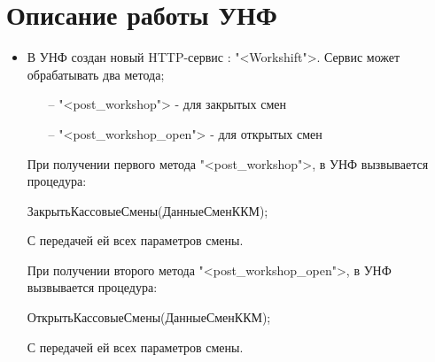 \section{Описание работы УНФ}

\begin{itemize}	
	\item В УНФ создан новый HTTP-сервис : "<Workshift">.
	Сервис может обрабатывать два метода;
\begin{itemize}	
	\item [--]  "<post\_workshop">  - для закрытых смен
	\item [--] "<post\_workshop\_open"> - для открытых смен
\end{itemize}
	При получении первого метода "<post\_workshop">, в УНФ вызвывается процедура: 
\begin{verbatim*}
	ЗакрытьКассовыеСмены(ДанныеСменККМ); 
\end{verbatim*}
С передачей ей всех  параметров смены.


	При получении второго метода "<post\_workshop\_open">, в УНФ вызвывается процедура: 
	\begin{verbatim*}
		ОткрытьКассовыеСмены(ДанныеСменККМ);
	\end{verbatim*}
	С передачей ей всех  параметров смены.



	

\end{itemize}
